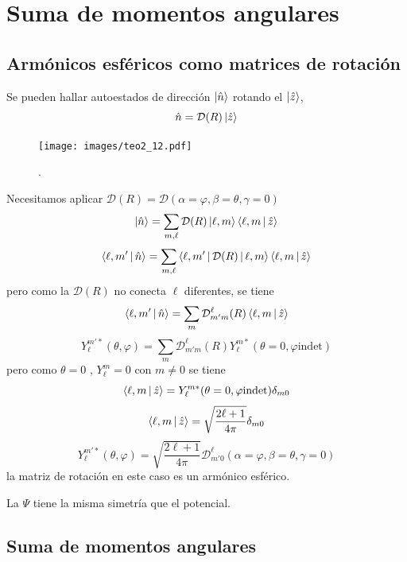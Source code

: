 \documentclass[10pt,oneside]{CBFT_book}
\begin{document}
\chapter{Suma de momentos angulares}

\section{Armónicos esféricos como matrices de rotación}

Se pueden hallar autoestados de dirección $\Ket{\hat{n}}$ rotando el $\Ket{\hat{z}}$,
\[
	\hat{n} = \mathcal{D}(R) \Ket{\hat{z}}
\]

\begin{figure}[!htb]
	\begin{center}
	\texttt{[image: images/teo2\_12.pdf]}
	\end{center}
	\caption{.}
\end{figure} 
Necesitamos aplicar $\mathcal{D}(R)=\mathcal{D}(\alpha=\varphi,\beta=\theta,\gamma=0)$
\[
	\Ket{\hat{n}} = \sum_{m,\ell} \mathcal{D} (R) \Ket{\ell,m}\Braket{\ell,m|\hat{z}}
\]
\[
	\Braket{\ell,m'|\hat{n}} = \sum_{m,\ell} \Braket{\ell,m'|\mathcal{D} (R)| \ell,m}\Braket{\ell,m|\hat{z}}
\]
pero como la $\mathcal{D}(R)$ no conecta $\ell$ diferentes, se tiene 
\[
	\Braket{\ell,m'|\hat{n}} = \sum_{m} \mathcal{D}_{m'm}^\ell(R) \Braket{\ell,m|\hat{z}}	
\]
\[
	Y_\ell^{m'*}(\theta,\varphi) = \sum_m \mathcal{D}_{m'm}^\ell(R) Y_\ell^{m*} (\theta=0,\varphi \text{indet})
\]
pero como $\theta=0$ , $Y_\ell^m = 0$  con $m\neq 0$ se tiene 
\[
	\Braket{\ell,m|\hat{z}} = Y_\ell^{m*} (\theta=0,\varphi \text{indet}) \delta_{m0}
\]
\[
	\Braket{\ell,m|\hat{z}} = \sqrt{ \frac{2\ell +1}{4\pi} } \delta_{m0}
\]
\[
	Y_\ell^{m'*}(\theta,\varphi) = \sqrt{ \frac{2\ell +1}{4\pi} }
	\mathcal{D}_{m'0}^\ell (\alpha=\varphi,\beta=\theta,\gamma=0)
\]
la matriz de rotación en este caso es un armónico esférico.

La $\Psi$ tiene la misma simetría que el potencial.

\section{Suma de momentos angulares}
\end{document}
